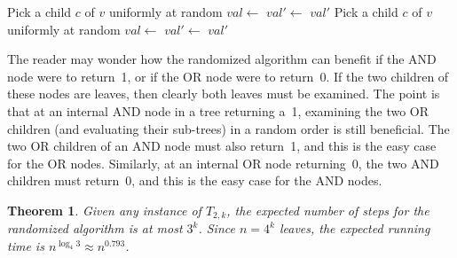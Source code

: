 \documentclass[twoside,12pt]{book}
\theoremstyle{plain}
\newtheorem{theorem}{Theorem}[chapter]
\theoremstyle{definition}
\theoremstyle{remark}
\begin{document}
\begin{algorithm}[htbp]
\caption{Randomized evaluation of $T_{2,k}$}
\label{alg:gametree}
\begin{algorithmic}[1]
  \State Pick a child $c$ of $v$ uniformly at random
  \State $val \gets$ 
    \State {}
  \EndIf
  \State $val' \gets$ 
  \State \Return $val'$
\EndProcedure
\Statex
{}
  \State Pick a child $c$ of $v$ uniformly at random
  \State $val \gets$ 
    \State {}
  \EndIf
  \State $val' \gets$ 
  \State \Return $val'$
\EndProcedure
\end{algorithmic}
\end{algorithm}

The reader may wonder how the randomized algorithm can benefit if the AND node
were to return~1, or if the OR node were to return~0.  If the two children of
these nodes are leaves, then clearly both leaves must be examined.  The point
is that at an internal AND node in a tree returning a~1, examining the two OR
children (and evaluating their sub-trees) in a random order is still
beneficial.  The two OR children of an AND node must also return~1, and this
is the easy case for the OR nodes.  Similarly, at an internal OR node
returning~0, the two AND children must return~0, and this is the easy case
for the AND nodes.

\begin{theorem}
\label{thm:gametree}
Given any instance of $T_{2,k}$, the expected number of steps for the
randomized algorithm is at most $3^k$.  Since $n=4^k$ leaves, the expected
running time is $n^{\log_4 3}\approx n^{0.793}$.
\end{theorem}
\end{document}
